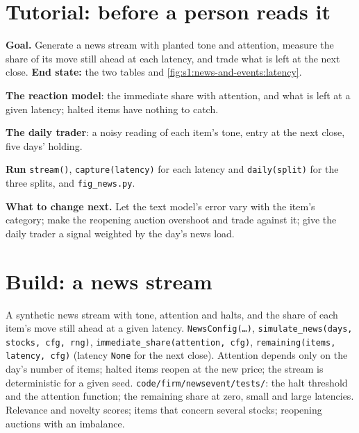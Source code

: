 \section{Tutorial: before a person reads it}\label{tut:s1:news-and-events:tut}

\begin{tutorial}
\textbf{Goal.} Generate a news stream with planted tone and attention, measure the share of its move still ahead at each latency, and trade what is left
at the next close. \textbf{End state:} the two tables and \cref{fig:s1:news-and-events:latency}.
\begin{tutsteps}
\item \textbf{The reaction model}: the immediate share with attention, and what is left at a given latency; halted items have nothing to catch.
\label{lst:s1:news-and-events:remaining}
\item \textbf{The daily trader}: a noisy reading of each item's tone, entry at the next close, five days' holding.
\label{lst:s1:news-and-events:daily}
\item \textbf{Run} \texttt{stream()}, \texttt{capture(latency)} for each latency and \texttt{daily(split)} for the three splits, and \texttt{fig\_news.py}.
\end{tutsteps}
\textbf{What to change next.} Let the text model's error vary with the item's category; make the reopening auction overshoot and trade against it; give
the daily trader a signal weighted by the day's news load.
\end{tutorial}

\section{Build: a news stream}\label{bld:s1:news-and-events:newsevent}

\begin{build}
 A synthetic news stream with tone, attention and halts, and the share of each item's move still ahead at a given latency.
 \texttt{NewsConfig(\dots)}, \texttt{simulate\_news(days, stocks, cfg, rng)}, \texttt{immediate\_share(attention, cfg)},
\texttt{remaining(items, latency, cfg)} (latency \texttt{None} for the next close).
 Attention depends only on the day's number of items; halted items reopen at the new price; the stream is deterministic for a given seed.
 \texttt{code/firm/newsevent/tests/}: the halt threshold and the attention function; the remaining share at zero, small and large
latencies.
 Relevance and novelty scores; items that concern several stocks; reopening auctions with an imbalance.
\end{build}

